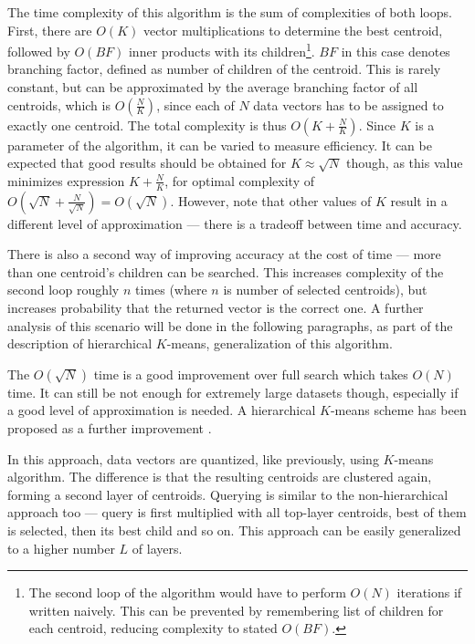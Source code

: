The time complexity of this algorithm is the sum of complexities of both loops.
First, there are $O(K)$ vector multiplications to determine the best centroid,
followed by $O(BF)$ inner products with its children\footnote{The second loop
of the algorithm would have to perform $O(N)$ iterations if written naively.
This can be prevented by remembering list of children for each centroid,
reducing complexity to stated $O(BF)$.}.
$BF$ in this case denotes
branching factor, defined as number of children of the centroid. This is rarely
constant, but can be approximated by the average branching factor of all centroids,
which is $O(\frac{N}{K})$, since each of $N$ data vectors has to be assigned
to exactly one centroid. The total complexity is thus $O(K + \frac{N}{K})$. Since
$K$ is a parameter of the algorithm, it can be varied to measure efficiency. It
can be expected that good results should be obtained for $K \approx \sqrt{N}$ 
though, as this value minimizes expression $K + \frac{N}{K}$, for optimal
complexity of $O(\sqrt{N} + \frac{N}{\sqrt{N}}) = O(\sqrt{N})$. However, note that other
values of $K$ result in a different level of approximation --- there is
a tradeoff between time and accuracy. 

There is also a second way of improving accuracy at the cost of time --- more
than one centroid's children can be searched. This increases complexity of the
second loop roughly $n$ times (where $n$ is number of selected centroids),
but increases probability that the returned vector is the correct  one. A further
analysis of this scenario will be done in the following paragraphs, as part
of the description of hierarchical $K$-means, generalization of this algorithm.


The $O(\sqrt{N})$ time is a good improvement over full search which 
takes $O(N)$ time. It can still be not enough for extremely large datasets
though, especially if a good level of approximation is needed. A hierarchical
$K$-means scheme has been proposed as a further improvement \cite{kmeans}.

In this approach, data vectors are quantized, like previously,
using $K$-means algorithm.
The difference is that the resulting centroids are clustered again, forming
a second layer of centroids. Querying is similar to the non-hierarchical
approach too --- query is first multiplied with all top-layer centroids,
best of them is selected, then its best child and
so on. This approach can be easily generalized to a higher number $L$  of layers.

